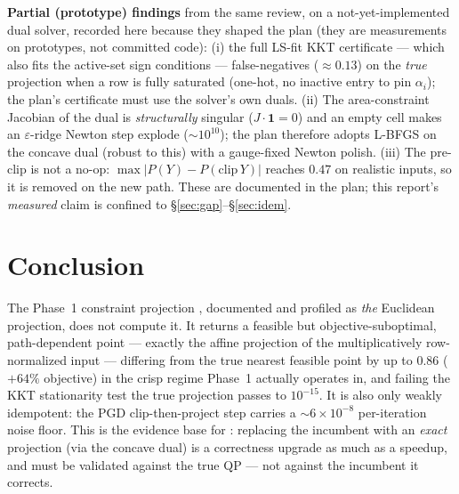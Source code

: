 \documentclass[11pt,a4paper]{article}
\begin{document}
\textbf{Partial (prototype) findings} from the same review, on a not-yet-implemented dual solver,
recorded here because they shaped the plan (they are measurements on prototypes, not committed
code): (i) the full LS-fit KKT certificate --- which also fits the active-set sign conditions ---
false-negatives (\(\approx 0.13\)) on the \emph{true} projection when a row is fully saturated
(one-hot, no inactive entry to pin \(\alpha_i\)); the plan's certificate must use the solver's own
duals. (ii) The area-constraint Jacobian of the dual is \emph{structurally} singular (\(J\cdot
\mathbf 1 = 0\)) and an empty cell makes an \(\varepsilon\)-ridge Newton step explode
(\(\sim\!10^{10}\)); the plan therefore adopts L-BFGS on the concave dual (robust to this) with a
gauge-fixed Newton polish. (iii) The pre-clip is not a no-op: \(\max|P(Y)-P(\text{clip}\,Y)|\)
reaches \(0.47\) on realistic inputs, so it is removed on the new path. These are documented in the
plan; this report's \emph{measured} claim is confined to \S\ref{sec:gap}--\S\ref{sec:idem}.

\section{Conclusion}
The Phase~1 constraint projection , documented and
profiled as \emph{the} Euclidean projection, does not compute it. It returns a feasible but
objective-suboptimal, path-dependent point --- exactly the affine projection of the
multiplicatively row-normalized input --- differing from the true nearest feasible point by up to
\(0.86\) (\(+64\%\) objective) in the crisp regime Phase~1 actually operates in, and failing the
KKT stationarity test the true projection passes to \(10^{-15}\). It is also only weakly
idempotent: the PGD clip-then-project step carries a \(\sim\!6{\times}10^{-8}\) per-iteration noise
floor. This is the evidence base for
: replacing the incumbent with an
\emph{exact} projection (via the concave dual) is a correctness upgrade as much as a speedup, and
must be validated against the true QP --- not against the incumbent it corrects.

\end{document}
